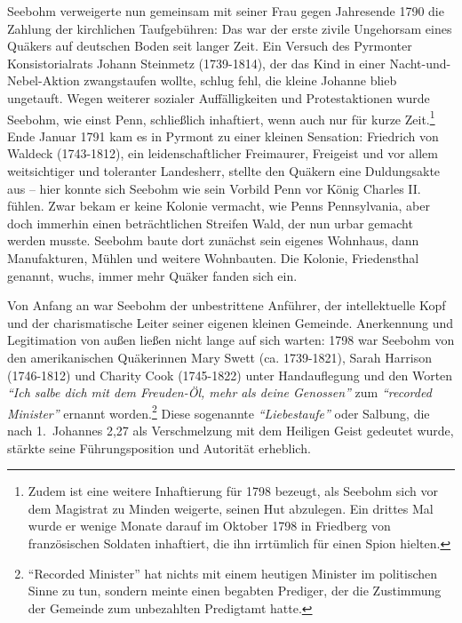 \medskip

Seebohm verweigerte nun gemeinsam mit seiner Frau gegen Jahresende 1790 die
Zahlung der kirchlichen Taufgebühren: Das war der erste
zivile Ungehorsam eines Quäkers auf deutschen Boden
seit langer Zeit. Ein Versuch des Pyrmonter Konsistorialrats Johann
Steinmetz (1739-1814), der das Kind in einer
Nacht-und-Nebel-Aktion zwangstaufen wollte, schlug fehl, die kleine
Johanne blieb ungetauft. Wegen weiterer
sozialer Auffälligkeiten und Protestaktionen wurde
Seebohm, wie einst Penn, schließlich
inhaftiert, wenn auch nur für kurze
Zeit.\footnote{Zudem ist eine weitere Inhaftierung für 1798 bezeugt, als Seebohm
sich vor
dem Magistrat zu Minden weigerte, seinen Hut abzulegen. Ein drittes Mal wurde er
wenige Monate darauf im Oktober 1798 in Friedberg von französischen Soldaten
inhaftiert, die ihn irrtümlich für einen Spion hielten.} Ende Januar 1791 kam es
in Pyrmont zu einer kleinen Sensation: Friedrich von
Waldeck (1743-1812), ein
leidenschaftlicher Freimaurer, Freigeist und vor
allem weitsichtiger und toleranter Landesherr, stellte den Quäkern eine
Duldungsakte aus -- hier konnte sich Seebohm wie sein
Vorbild Penn vor König Charles II. fühlen.
Zwar bekam er keine Kolonie vermacht, wie Penns Pennsylvania, aber doch
immerhin einen beträchtlichen Streifen Wald, der nun urbar gemacht werden
musste. Seebohm baute dort zunächst sein eigenes Wohnhaus, dann Manufakturen,
Mühlen und weitere Wohnbauten. Die Kolonie,
Friedensthal genannt, wuchs, immer mehr Quäker fanden
sich ein.

\medskip

Von Anfang an war Seebohm der unbestrittene Anführer, der intellektuelle Kopf
und der charismatische Leiter seiner eigenen kleinen Gemeinde. Anerkennung und
Legitimation von außen ließen nicht lange auf sich warten: 1798 war Seebohm von
den amerikanischen Quäkerinnen Mary Swett (ca.
1739-1821), Sarah Harrison (1746-1812) und Charity Cook (1745-1822) unter Handauflegung und den Worten \textit{"`Ich salbe dich mit dem
Freuden-Öl, mehr als deine Genossen"'} zum \textit{"`recorded Minister"'} ernannt worden.\footnote{"`Recorded Minister"' hat nichts mit einem
heutigen Minister im politischen
Sinne zu tun, sondern meinte einen begabten Prediger, der die Zustimmung der
Gemeinde zum unbezahlten Predigtamt hatte.} Diese sogenannte
\textit{"`Liebestaufe"'} oder Salbung, die nach
1.~Johannes 2,27 als Verschmelzung mit dem Heiligen Geist
gedeutet wurde, stärkte seine Führungsposition und Autorität erheblich.

